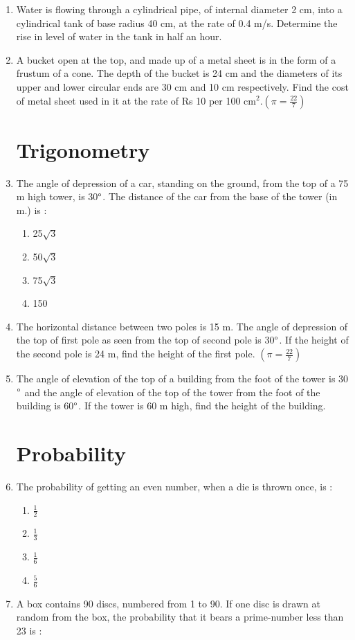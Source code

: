 \documentclass[10pt,-letter paper]{article}
\providecommand{\brak}[1]{\ensuremath{\left(#1\right)}}
\begin{document}
\begin{enumerate}
 \item Water is flowing through a cylindrical pipe, of internal diameter 2 cm, into a cylindrical tank of base radius 40 cm, at the rate of 0.4 m/s. Determine the rise in level of water in the tank in half an hour.
\item A bucket open at the top, and made up of a metal sheet is in the form of a frustum of a cone. The depth of the bucket is 24 cm and the diameters of its upper and lower circular ends are 30 cm and 10 cm respectively. Find the cost of metal sheet used in it at the rate of Rs 10 per 100 cm$^2$.$\brak{ \pi = \frac{22}{7}}$
  \section{Trigonometry}
\item The angle of depression of a car, standing on the ground, from the top of a
75 m high tower, is 30$\degree$. The distance of the car from the base of the tower
(in m.) is : \\
 \begin{enumerate}
    \item 25$\sqrt{3}$\\
    \item 50$\sqrt{3}$\\
    \item 75$\sqrt{3}$\\
    \item 150
 \end{enumerate}
 \item The horizontal distance between two poles is 15 m. The angle of depression of the top of first pole as seen from the top of second pole is 30$\degree$. If the height of the second pole is 24 m, find the height of the first pole. $\brak{ \pi = \frac{22}{7}}$
 
\item The angle of elevation of the top of a building from the foot of the tower is 30$\degree$ and the angle of elevation of the top of the tower from the foot of the building is 60$\degree$. If the tower is 60 m high, find the height of the building. 
  \section{Probability}
\item  The probability of getting an even number, when a die is thrown once, is :

 \begin{enumerate}
    \item $\frac{1}{2}$\\
    \item $\frac{1}{3}$\\
    \item $\frac{1}{6}$\\
    \item $\frac{5}{6}$
 \end{enumerate}
 \item A box contains 90 discs, numbered from 1 to 90. If one disc is drawn at random from the box, the probability that it bears a prime-number less than 23 is :
 

\end{enumerate}
\end{document}
